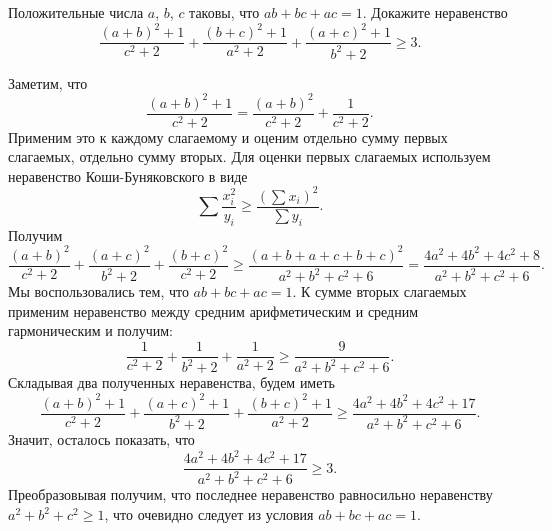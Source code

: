Положительные числа $a$, $b$, $c$ таковы, что $a b + b c + a c = 1$.
Докажите неравенство
\[
    \frac{(a + b)^2 + 1}{c^2 + 2}
    +
    \frac{(b + c)^2 + 1}{a^2 + 2}
    +
    \frac{(a + c)^2 + 1}{b^2 + 2}
\geq
    3
.\]

\solution
Заметим, что
\[
    \frac{(a + b)^2 + 1}{c^2 + 2}
=
    \frac{(a + b)^2}{c^2 + 2} + \frac{1}{c^2 + 2}
.\]
Применим это к каждому слагаемому и оценим отдельно сумму первых слагаемых,
отдельно сумму вторых.
Для оценки первых слагаемых используем неравенство Коши-Буняковского в виде
\[
    \sum\frac{x_i^2}{y_i}
\geq
    \frac{(\sum x_i)^2}{\sum y_i}
.\]
Получим
\[
    \frac{(a + b)^2}{c^2 + 2}
    +
    \frac{(a + c)^2}{b^2 + 2}
    +
    \frac{(b + c)^2}{c^2+2}
\geq
    \frac{(a + b + a + c + b + c)^2}{a^2 + b^2 + c^2 + 6}
=
    \frac{4 a^2 + 4 b^2 + 4 c^2 + 8}{a^2 + b^2 + c^2 + 6}
.\]
Мы воспользовались тем, что $a b + b c + a c = 1$.
К сумме вторых слагаемых применим неравенство между средним арифметическим и
средним гармоническим и получим:
\[
    \frac{1}{c^2 + 2}
    +
    \frac{1}{b^2 + 2}
    +
    \frac{1}{a^2 + 2}
\geq
    \frac{9}{a^2 + b^2 + c^2 + 6}
.\]
Складывая два полученных неравенства, будем иметь
\[
    \frac{(a + b)^2 + 1}{c^2 + 2}
    +
    \frac{(a + c)^2 + 1}{b^2 + 2}
    +
    \frac{(b + c)^2 + 1}{a^2 + 2}
\geq
    \frac{4 a^2 + 4 b^2 + 4 c^2 + 17}{a^2 + b^2 + c^2 + 6}.
\]
Значит, осталось показать, что
\[
    \frac{4 a^2 + 4 b^2 + 4 c^2 + 17}{a^2 + b^2 + c^2 + 6}
\geq
    3
.\]
Преобразовывая получим, что последнее неравенство равносильно неравенству
$a^2 + b^2 + c^2 \geq 1$, что очевидно следует из условия
$a b + b c + a c = 1$.

